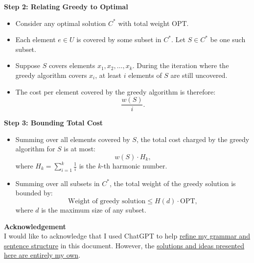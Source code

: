 \documentclass[10pt,letter,notitlepage]{article}
\begin{document}
\begin{Answer}
\textbf{Step 2: Relating Greedy to Optimal}
\begin{itemize}
    \item Consider any optimal solution \(C^*\) with total weight \(\text{OPT}\).
    \item Each element \(e \in U\) is covered by some subset in \(C^*\). Let \(S \in C^*\) be one such subset.
    \item Suppose \(S\) covers elements \(x_1, x_2, \dots, x_k\). During the iteration where the greedy algorithm covers \(x_i\), at least \(i\) elements of \(S\) are still uncovered.
    \item The cost per element covered by the greedy algorithm is therefore:
    \[
    \frac{w(S)}{i}.
    \]
\end{itemize}

\textbf{Step 3: Bounding Total Cost}
\begin{itemize}
    \item Summing over all elements covered by \(S\), the total cost charged by the greedy algorithm for \(S\) is at most:
    \[
    w(S) \cdot H_k,
    \]
    where \(H_k = \sum_{i=1}^k \frac{1}{i}\) is the \(k\)-th harmonic number.
    \item Summing over all subsets in \(C^*\), the total weight of the greedy solution is bounded by:
    \[
    \text{Weight of greedy solution} \leq H(d) \cdot \text{OPT},
    \]
    where \(d\) is the maximum size of any subset.
\end{itemize}


\end{Answer}



\vspace{+0.5cm}

\par \textbf{Acknowledgement}\\

I would like to acknowledge that I used ChatGPT to help \underline{refine my grammar and sentence structure} in this document. However, the \underline{solutions and ideas presented here are entirely my own}. 
\end{document}
